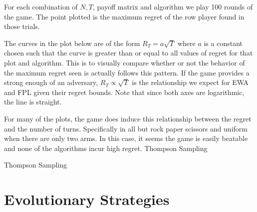 \documentclass[10pt,a4paper]{article} %
\begin{document}
	For each combination of $N, T$, payoff matrix and algorithm we play 100 rounds of the game.  The point plotted is the maximum regret of the row player found in those trials.
	
	\pagebreak

	The curves in the plot below are of the form $R_T = a \sqrt{T}$ where $a$ is a constant chosen such that the curve is greater than or equal to all values of regret for that plot and algorithm.  This is to visually compare whether or not the behavior of the maximum regret seen is actually follows this pattern. If the game provides a strong enough of an adversary, $R_T \propto \sqrt{T}$ is the relationship we expect for EWA and FPL given their regret bounds.  Note that since both axes are logarithmic, the line is straight. 
	
	For many of the plots, the game does induce this relationship between the regret and the number of turns.  Specifically in all but rock paper scissors and uniform when there are only two arms.  In this case, it seems the game is easily beatable and none of the algorithms incur high regret.  Thompson Sampling 
	
	Thompson Sampling 

	\begin{figure}[h!]
	\end{figure}

	
	\pagebreak
	
	\section{Evolutionary Strategies}	
	
\end{document}
